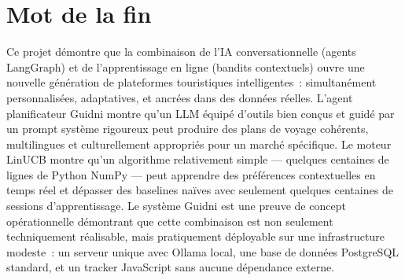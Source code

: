 \section*{Mot de la fin}

Ce projet démontre que la combinaison de l'IA conversationnelle (agents LangGraph) et de
l'apprentissage en ligne (bandits contextuels) ouvre une nouvelle génération de plateformes
touristiques intelligentes~: simultanément personnalisées, adaptatives, et ancrées dans des
données réelles. L'agent planificateur Guidni montre qu'un LLM équipé d'outils bien conçus
et guidé par un prompt système rigoureux peut produire des plans de voyage cohérents,
multilingues et culturellement appropriés pour un marché spécifique. Le moteur LinUCB montre
qu'un algorithme relativement simple --- quelques centaines de lignes de Python NumPy ---
peut apprendre des préférences contextuelles en temps réel et dépasser des baselines naïves
avec seulement quelques centaines de sessions d'apprentissage. Le système Guidni est une
preuve de concept opérationnelle démontrant que cette combinaison est non seulement
techniquement réalisable, mais pratiquement déployable sur une infrastructure modeste~:
un serveur unique avec Ollama local, une base de données PostgreSQL standard, et un tracker
JavaScript sans aucune dépendance externe.
